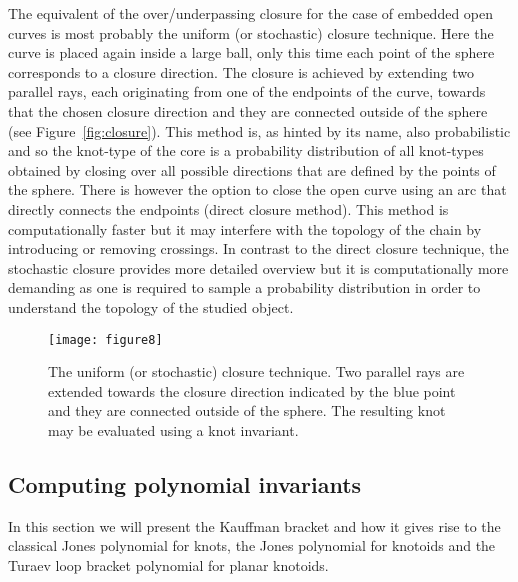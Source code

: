 The equivalent of the over/underpassing closure for the case of embedded open curves is most probably the uniform (or stochastic) closure technique\cite{mansfield1994, sulkowska2012, lua2006,millett2004, jamroz2014}.
Here the curve is placed again inside a large ball, only this time each point of the sphere corresponds to a closure direction. The closure is achieved by extending two parallel rays, each originating from one of the endpoints of the curve, towards that the chosen closure direction and they are connected outside of the sphere (see Figure~\ref{fig:closure}).
This method is, as hinted by its name, also probabilistic and so the knot-type of the core is a probability distribution of all knot-types obtained by closing over all possible directions that are defined by the points of the sphere.
There is however the option to close the open curve using an arc that directly connects the endpoints\cite{taylor2000,virnau2006} (direct closure method). This method is computationally faster but it may interfere with the topology of the chain by introducing or removing crossings. In contrast to the direct closure technique, the stochastic closure provides more detailed overview but it is computationally more demanding as one is required to sample a probability distribution in order to understand the topology of the studied object.
\begin{figure}[h]
\centering
\texttt{[image: figure8]}
\caption{The uniform (or stochastic) closure technique. Two parallel rays are extended towards the closure direction indicated by the blue point and they are connected outside of the sphere. The resulting knot may be evaluated using a knot invariant.}\label{fig:stochastic}
\end{figure}

\subsection{\label{sec:theory:jones}Computing polynomial invariants}
In this section we will present the Kauffman bracket\cite{kauffman1988} and how it gives rise to the classical Jones polynomial for knots\cite{jones}, the Jones polynomial for knotoids\cite{turaev,guka} and the Turaev loop bracket polynomial for planar knotoids\cite{turaev}. 

